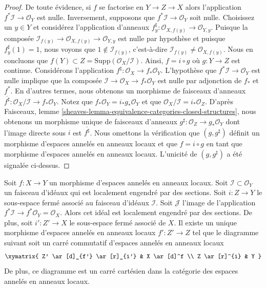 \begin{proof}
De toute évidence, si $f$ se factorise en $Y \to Z \to X$
alors l'application $f^*\mathcal{I} \to \mathcal{O}_Y$ est nulle.
Inversement, supposons que $f^*\mathcal{I} \to \mathcal{O}_Y$
soit nulle. Choisissez un $y \in Y$ et considérez
l'application d'anneaux $f^\sharp_y : \mathcal{O}_{X, f(y)} \to
\mathcal{O}_{Y, y}$.
Puisque la composée $\mathcal{I}_{f(y)} \to \mathcal{O}_{X, f(y)} \to
\mathcal{O}_{Y, y}$ est nulle par hypothèse et puisque
$f^\sharp_y(1) = 1$, nous voyons que $1 \not \in \mathcal{I}_{f(y)}$,
c'est-à-dire $\mathcal{I}_{f(y)} \not = \mathcal{O}_{X, f(y)}$.
Nous en concluons que $f(Y) \subset Z = \text{Supp}(\mathcal{O}_X/\mathcal{I})$.
Ainsi, $f = i \circ g$ où $g : Y \to Z$ est
continue. Considérons l'application $f^\sharp : \mathcal{O}_X \to
f_*\mathcal{O}_Y$. L'hypothèse que $f^*\mathcal{I} \to \mathcal{O}_Y$ est nulle implique
que la composée $\mathcal{I} \to \mathcal{O}_X \to f_*\mathcal{O}_Y$ est
nulle par adjonction de $f_*$ et $f^*$. En
d'autres termes, nous obtenons un morphisme de faisceaux
d'anneaux $\overline{f^\sharp} : \mathcal{O}_X/\mathcal{I} \to f_*\mathcal{O}_Y$.
Notez que $f_*\mathcal{O}_Y = i_*g_*\mathcal{O}_Y$ et que
$\mathcal{O}_X/\mathcal{I} = i_*\mathcal{O}_Z$. D'après
Faisceaux, lemme \ref{sheaves-lemma-equivalence-categories-closed-structures}, nous obtenons
un morphisme unique de faisceaux d'anneaux $g^\sharp
: \mathcal{O}_Z \to g_*\mathcal{O}_Y$ dont l'image directe sous $i$
est $\overline{f^\sharp}$. Nous omettons la vérification que $(g, g^\sharp)$
définit un morphisme d'espaces annelés en anneaux locaux et
que $f = i \circ g$ en tant que morphisme d'espaces annelés en anneaux
locaux. L'unicité de $(g, g^\sharp)$ a été signalée ci-dessus.
\end{proof}

\begin{lemma}
\label{lemma-restrict-map-to-closed}
Soit $f : X \to Y$ un morphisme d'espaces annelés en anneaux
locaux. Soit $\mathcal{I} \subset \mathcal{O}_Y$ un faisceau
d'idéaux qui est localement engendré par des
sections. Soit $i : Z \to Y$ le sous-espace fermé associé au
faisceau d'idéaux $\mathcal{I}$. Soit
$\mathcal{J}$ l'image de l'application
$f^*\mathcal{I} \to f^*\mathcal{O}_Y = \mathcal{O}_X$. Alors
cet idéal est localement engendré par des sections. De
plus, soit $i' : Z' \to X$ le sous-espace fermé associé
de $X$. Il existe un unique morphisme
d'espaces annelés en anneaux locaux $f' : Z' \to Z$ tel que le
diagramme suivant soit un carré commutatif d'espaces
annelés en anneaux locaux
$$
\xymatrix{
Z' \ar[d]_{f'} \ar[r]_{i'} & X \ar[d]^f \\ Z
\ar[r]^{i} & Y
}
$$
De plus, ce diagramme est un carré cartésien dans la catégorie des espaces
annelés en anneaux locaux.
\end{lemma}

